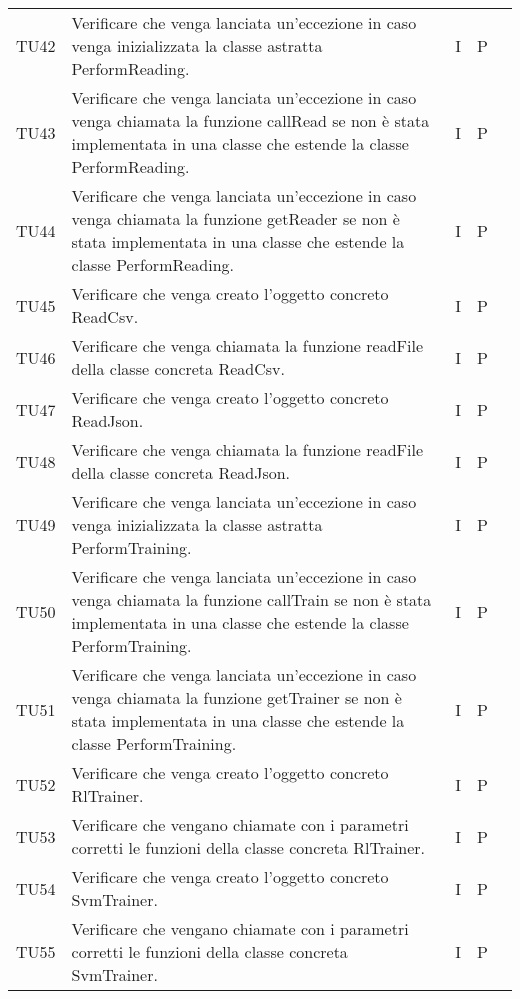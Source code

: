 \begin{longtable} {
		>{}p{15mm} 
		>{}p{79.5mm}
		>{}p{15mm} 
		>{}p{15mm}
		>{}p{0mm}}
	TU42		& Verificare che venga lanciata un'eccezione in caso venga inizializzata la classe astratta  PerformReading.& I & P &\TBstrut \\ [2mm]
	TU43		& Verificare che venga lanciata un'eccezione in caso venga chiamata la funzione callRead se non è stata implementata in una classe che estende la classe PerformReading.& I & P &\TBstrut \\ [2mm]
	TU44		& Verificare che venga lanciata un'eccezione in caso venga chiamata la funzione getReader se non è stata implementata in una classe che estende la classe PerformReading.& I & P &\TBstrut \\ [2mm]
	TU45		& Verificare che venga creato l'oggetto concreto ReadCsv.& I & P &\TBstrut \\ [2mm]
	TU46		& Verificare che venga chiamata la funzione readFile della classe concreta ReadCsv.& I & P &\TBstrut \\ [2mm]
	TU47		& Verificare che venga creato l'oggetto concreto ReadJson.& I & P &\TBstrut \\ [2mm]
	TU48		& Verificare che venga chiamata la funzione readFile della classe concreta ReadJson.& I & P &\TBstrut \\ [2mm]
	TU49		& Verificare che venga lanciata un'eccezione in caso venga inizializzata la classe astratta  PerformTraining.& I & P &\TBstrut \\ [2mm]
	TU50		& Verificare che venga lanciata un'eccezione in caso venga chiamata la funzione callTrain se non è stata implementata in una classe che estende la classe PerformTraining.& I & P &\TBstrut \\ [2mm]
	TU51		& Verificare che venga lanciata un'eccezione in caso venga chiamata la funzione getTrainer se non è stata implementata in una classe che estende la classe PerformTraining.& I & P &\TBstrut \\ [2mm]
	TU52		& Verificare che venga creato l'oggetto concreto RlTrainer.& I & P &\TBstrut \\ [2mm]
	TU53		& Verificare che vengano chiamate con i parametri corretti le funzioni della classe concreta RlTrainer.& I & P &\TBstrut \\ [2mm]
	TU54		& Verificare che venga creato l'oggetto concreto SvmTrainer.& I & P &\TBstrut \\ [2mm]
	TU55		& Verificare che vengano chiamate con i parametri corretti le funzioni della classe concreta SvmTrainer.& I & P &\TBstrut \\ [2mm]

\end{longtable}
